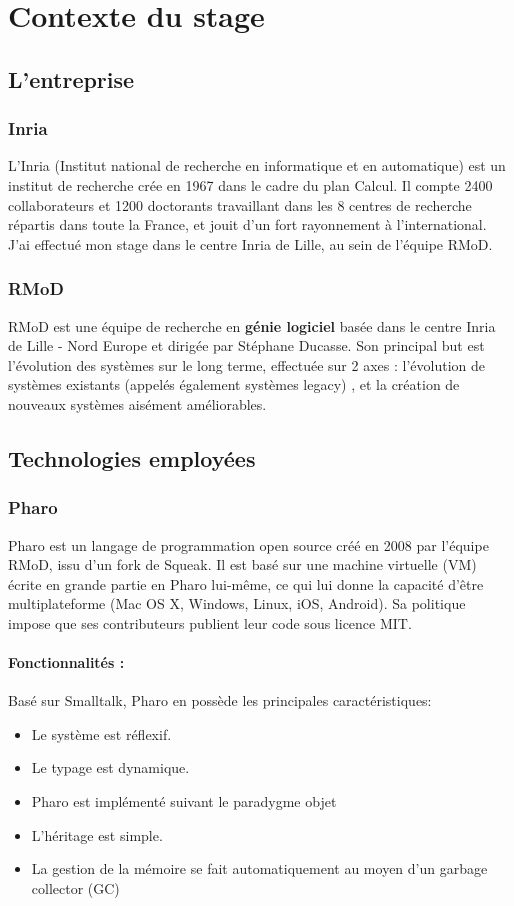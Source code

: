 	\section{Contexte du stage}
	\subsection{L'entreprise}
	\subsubsection{Inria}
		L'Inria (Institut national de recherche en informatique et en automatique) est un institut de recherche crée en 1967 dans le cadre du plan Calcul. Il compte 2400 collaborateurs et 1200 doctorants travaillant dans les 8 centres de recherche répartis dans toute la France, et jouit d'un fort rayonnement à l'international. J'ai effectué mon stage dans le centre Inria de Lille, au sein de l'équipe RMoD.
	\subsubsection{RMoD}
	RMoD est une équipe de recherche en \textbf{génie logiciel} basée dans le centre Inria de Lille - Nord Europe et dirigée par Stéphane Ducasse. Son principal but est l'évolution des systèmes sur le long terme, effectuée sur 2 axes : l'évolution de systèmes existants (appelés également systèmes legacy) , et la création de nouveaux systèmes aisément améliorables.
	
	\subsection{Technologies employées}
	\subsubsection{Pharo}
	Pharo est un langage de programmation open source créé en 2008 par l'équipe RMoD, issu d'un fork de Squeak. Il est basé sur une machine virtuelle (VM) écrite en grande partie en Pharo lui-même, ce qui lui donne la capacité d'être multiplateforme (Mac OS X, Windows, Linux, iOS, Android). Sa politique impose que ses contributeurs publient leur code sous licence MIT.
	
	\paragraph{Fonctionnalités :}
	Basé sur Smalltalk, Pharo en possède les principales caractéristiques:
	\begin{itemize}
		\item Le système est réflexif.
		\item Le typage est dynamique.
		\item Pharo est implémenté suivant le paradygme objet
		\item L'héritage est simple.
		\item La gestion de la mémoire se fait automatiquement au moyen d'un garbage collector (GC)
	\end{itemize}

